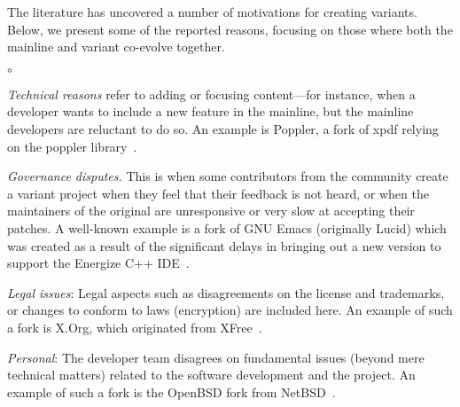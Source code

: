 The literature has uncovered a number of motivations for creating variants. Below, we present some of the reported reasons, focusing on those where both the mainline and variant co-evolve together.


\begin{list}{$\circ$}{}
   \item \textit{Technical reasons} refer to adding or focusing content---for instance, when a developer wants to include a new feature in the mainline, but the mainline developers are reluctant to do so. An example is \textsf{Poppler}, a fork of \textsf{xpdf} relying on the \textsf{poppler} library~\cite{Gregorio:2012,Wheeler:2015Forking}.

    \item \textit{Governance disputes.} This is when some contributors from the community create a variant project when they feel that their feedback is not heard, or when the maintainers of the original are unresponsive or very slow at accepting their patches. A well-known example is a fork of \textsf{GNU Emacs} (originally \textsf{Lucid}) which was created as a result of the significant delays in bringing out a new version to support the Energize C++ IDE~\cite{Wheeler:2015Forking}.

\item \textit{Legal issues}: Legal aspects such as disagreements on the license and trademarks, or changes to conform to laws (encryption) are included here. An example of such a fork is \textsf{X.Org}, which originated from \textsf{XFree}~\cite{Gregorio:2012,Wheeler:2015Forking}.

\item \textit{Personal}: The developer team disagrees on fundamental issues (beyond mere technical matters) related to the software development and the project. An example of such a fork is the \textsf{OpenBSD} fork from \textsf{NetBSD}~\cite{Gregorio:2012}.


\end{list}

